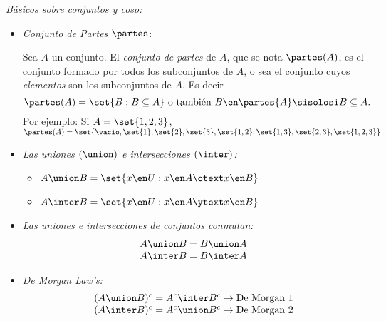 \textit{\hypertarget{teoria-1:basicos-conjuntos}{Básicos sobre conjuntos y coso: }}
\begin{itemize}[label={\tiny{}}]
  \item \textit{Conjunto de Partes $\partes$}:

        Sea $A$ un conjunto. El \textit{conjunto de partes} de $A$, que se nota $\partes(A)$, es el
        conjunto formado por todos los subconjuntos de $A$, o sea el conjunto cuyos \textit{elementos} son
        los subconjuntos de $A$. Es decir
        $$
          \partes(A) = \set{B : B \subseteq A} \text{ o también } B \en \partes{A} \sisolosi B \subseteq A.
        $$
        Por ejemplo: Si $A = \set{1,2,3}$, $\partes(A) = \set{\vacio, \set{1},\set{2},\set{3},\set{1,2}, \set{1,3}, \set{2,3},\set{1,2,3}}$

  \item \textit{ Las uniones  $(\union)$ e intersecciones $(\inter)$:}
        \begin{itemize}[label={\tiny{}}]
          \item $A \union B = \set{x \en U : x \en A \otext x \en B}$
          \item $A \inter B = \set{x \en U : x \en A \ytext x \en B}$
        \end{itemize}

  \item \textit{ Las uniones e intersecciones de conjuntos conmutan:}
        $$
          \begin{array}{c}
            A \union B = B \union A \\
            A \inter B = B \inter A
          \end{array}
        $$

  \item
        \textit{De Morgan Law's: }
        $$
          \begin{array}{c}
            (A \union B)^c = A^c \inter B^c \to \text{De Morgan 1} \\
            (A \inter B)^c = A^c \union B^c \to \text{De Morgan 2}
          \end{array}
        $$


\end{itemize}
